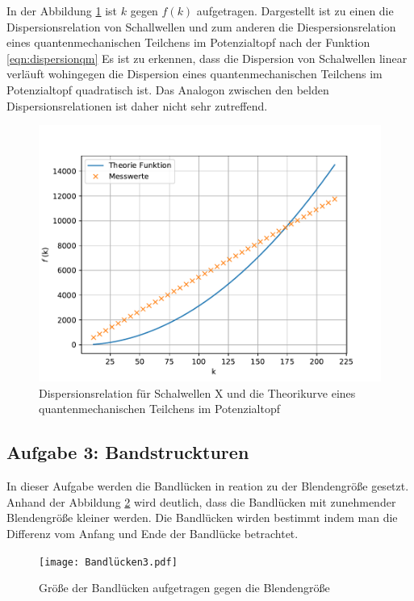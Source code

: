 In der Abbildung \ref{fig.Aufgabe2} ist $k$ gegen $f(k)$ aufgetragen. Dargestellt ist zu einen die Dispersionsrelation von Schallwellen und zum anderen die Diespersionsrelation eines quantenmechanischen Teilchens im Potenzialtopf nach der Funktion \ref{eqn:dispersionqm}
Es ist zu erkennen, dass die Dispersion von Schalwellen linear verläuft wohingegen die Dispersion eines quantenmechanischen Teilchens im Potenzialtopf quadratisch ist.
Das Analogon zwischen den belden Dispersionsrelationen ist daher nicht sehr zutreffend.
\begin{figure}[h!]
  \centering
  \includegraphics[width=\textwidth]{f(k).pdf}
  \caption{Dispersionsrelation für Schalwellen X und die Theorikurve eines quantenmechanischen Teilchens im Potenzialtopf}
  \label{fig.Aufgabe2}
\end{figure}
\FloatBarrier

\subsection{Aufgabe 3: Bandstruckturen}
In dieser Aufgabe werden die Bandlücken in reation zu der Blendengröße gesetzt.
Anhand der Abbildung \ref{fig.Aufgabe3} wird deutlich, dass die Bandlücken mit zunehmender Blendengröße kleiner werden.
Die Bandlücken wirden bestimmt indem man die Differenz vom Anfang und Ende der Bandlücke betrachtet.
\begin{figure}[h!]
  \centering
  \texttt{[image: Bandlücken3.pdf]}
  \caption{Größe der Bandlücken aufgetragen gegen die Blendengröße}
  \label{fig.Aufgabe3}
\end{figure}
\FloatBarrier

